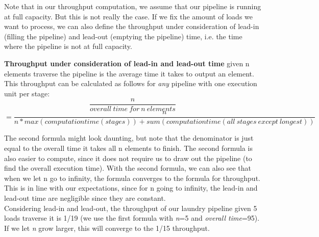 \documentclass[main.tex]{subfiles}
\begin{document}
Note that in our throughput computation, we assume that our pipeline is running at full capacity. But this is not really the case. If we fix the amount of loads we want to process, we can also define the throughput under consideration of lead-in (filling the pipeline) and lead-out (emptying the pipeline) time, i.e. the time where the pipeline is not at full capacity.
\begin{definition}
    \textbf{Throughput under consideration of lead-in and lead-out time} given n elements traverse the pipeline is the average time it takes to output an element. This throughput can be calculated as follows for \textit{any} pipeline with one execution unit per stage:
    \begin{equation*}
      \frac{n}{overall\ time\ for\ n\ elements}
    \end{equation*}
    \begin{equation*}
      =\frac{n}{n*max(computationtime(stages))+ sum(computationtime(all\ stages\ except\ longest))}
    \end{equation*}
\end{definition}
The second formula might look daunting, but note that the denominator is just equal to the overall time it takes all n elements to finish. The second formula is also easier to compute, since it does not require us to draw out the pipeline (to find the overall execution time). With the second formula, we can also see that when we let n go to infinity, the formula converges to the formula for throughput. This is in line with our expectations, since for n going to infinity, the lead-in and lead-out time are negligible since they are constant.\\
Considering lead-in and lead-out, the throughput of our laundry pipeline given 5 loads traverse it is 1/19 (we use the first formula with \textit{n}=5 and \textit{overall time}=95). If we let \textit{n} grow larger, this will converge to the 1/15 throughput.
\end{document}
